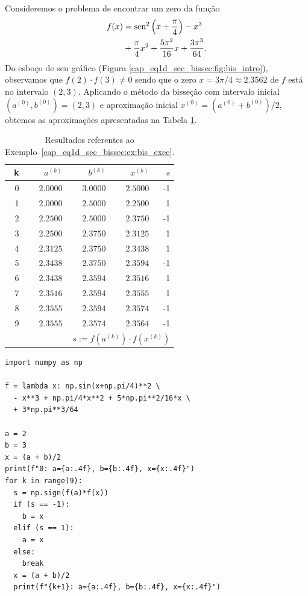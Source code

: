 \begin{ex}\label{cap_eq1d_sec_bissec:ex:bis_exec}
  Consideremos o problema de encontrar um zero da função
  \begin{equation}
    \begin{aligned}
      f(x) &= \operatorname{sen}^2\left(x+\frac{\pi}{4}\right) - x^3 \\
           &+ \frac{\pi}{4}x^2 + \frac{5\pi^2}{16}x + \frac{3\pi^3}{64}.
    \end{aligned}
\end{equation}
Do esboço de seu gráfico (Figura \ref{cap_eq1d_sec_bissec:fig:bis_intro}), observamos que $f(2)\cdot f(3) \neq 0$ sendo que o zero $x=3\pi/4\approx 2.3562$ de $f$ está no intervalo $(2, 3)$. Aplicando o método da bisseção com intervalo inicial $(a^{(0)}, b^{(0)}) = (2, 3)$ e aproximação inicial $x^{(0)} = (a^{(0)}+b^{(0)})/2$, obtemos as aproximações apresentadas na Tabela \ref{cap_eq1d_sec_bissec:tab:bis_exec}.

\begin{table}[h!]
  \centering
  \caption{Resultados referentes ao Exemplo~\ref{cap_eq1d_sec_bissec:ex:bis_exec}.}
  \begin{tabular}{r|rr|r|r}
    k & $a^{(k)}$ & $b^{(k)}$ & $x^{(k)}$ & $s$ \\\hline
    0 & $2.0000$ & $3.0000$ & $2.5000$ & -1 \\
    1 & $2.0000$ & $2.5000$ & $2.2500$ &  1 \\
    2 & $2.2500$ & $2.5000$ & $2.3750$ & -1 \\
    3 & $2.2500$ & $2.3750$ & $2.3125$ & 1 \\
    4 & $2.3125$ & $2.3750$ & $2.3438$ & 1 \\
    5 & $2.3438$ & $2.3750$ & $2.3594$ &  -1 \\
    6 & $2.3438$ & $2.3594$ & $2.3516$ & 1 \\
    7 & $2.3516$ & $2.3594$ & $2.3555$ &  1 \\
    8 & $2.3555$ & $2.3594$ & $2.3574$ &  -1 \\
    9 & $2.3555$ & $2.3574$ & $2.3564$ & -1 \\\hline
    \multicolumn{5}{r}{\small $s := f(a^{(k)})\cdot f(x^{(k)})$}
  \end{tabular}
  \label{cap_eq1d_sec_bissec:tab:bis_exec}
\end{table}

\begin{lstlisting}
import numpy as np

f = lambda x: np.sin(x+np.pi/4)**2 \
  - x**3 + np.pi/4*x**2 + 5*np.pi**2/16*x \
  + 3*np.pi**3/64

a = 2
b = 3
x = (a + b)/2
print(f"0: a={a:.4f}, b={b:.4f}, x={x:.4f}")
for k in range(9):
  s = np.sign(f(a)*f(x))
  if (s == -1):
    b = x
  elif (s == 1):
    a = x
  else:
    break
  x = (a + b)/2
  print(f"{k+1}: a={a:.4f}, b={b:.4f}, x={x:.4f}")
\end{lstlisting}

\end{ex}

